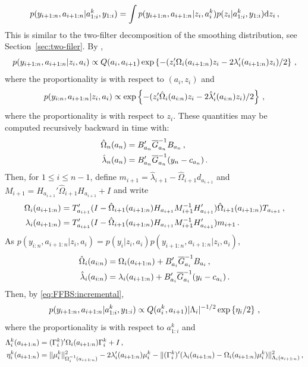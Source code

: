 \begin{equation}
\label{eq:FFBS:incremental}
p(y_{i+1:n},a_{i+1:n}|a^k_{1:i},y_{1:i}) = \int p(y_{i+1:n},a_{i+1:n}|z_i,a^k_{i})p(z_{i}|a^k_{1:i},y_{1:i})\mathrm{d} z_i\,,
\end{equation}
This is similar to the two-filter decomposition of the smoothing distribution, see Section~\ref{sec:two-filer}. By  \cite{lindsten:bunch:sarkka:schon:godsill:2015},
\[
p(y_{i+1:n},a_{i+1:n}|z_i,a_{i}) \propto Q(a_i,a_{i+1}) \exp\left\{-(z_i'\Omega_i(a_{i+1:n})z_i-2\lambda_i'(a_{i+1:n})z_i)/2\right\}\,,
\]
where the proportionality is with respect to $(a_i,z_i)$ and
\[
p(y_{i:n},a_{i+1:n}|z_i,a_{i}) \propto \exp\left\{-(z_i'\hat{\Omega}_i(a_{i:n})z_i-2\hat{\lambda}'_i(a_{i:n})z_i)/2\right\}\,,
\]
where the proportionality is with respect to $z_i$. These quantities may be computed recursively backward in time with:
\begin{align*}
\hat{\Omega}_n(a_n) &= B'_{a_n}\overline{G}^{-1}_{a_n}B_{a_n}\,,\\
\hat{\lambda}_n(a_n) &=B'_{a_n}\overline{G}^{-1}_{a_n}(y_n-c_{a_n})\,.
\end{align*}
Then, for $1\le i\le n-1$, define $m_{i+1} = \hat{\lambda}_{i+1} - \hat{\Omega}_{i+1}d_{a_{i+1}}$ and $M_{i+1} = H_{a_{i+1}}'\hat{\Omega}_{i+1}H_{a_{i+1}} + I$ and write
\begin{align*}
\Omega_i(a_{i+1:n}) &= T'_{a_{i+1}}(I-\hat{\Omega}_{i+1}(a_{i+1:n})H_{a_{i+1}}M^{-1}_{i+1}H'_{a_{i+1}})\hat{\Omega}_{i+1}(a_{i+1:n})T_{a_{i+1}}\,,\\
\lambda_i(a_{i+1:n}) &=T'_{a_{i+1}}(I-\hat{\Omega}_{i+1}(a_{i+1:n})H_{a_{i+1}}M^{-1}_{i+1}H'_{a_{i+1}})m_{i+1}\,.
\end{align*}
As $p(y_{i:n},a_{i+1:n}|z_i,a_{i}) = p(y_{i}|z_i,a_{i})p(y_{i+1:n},a_{i+1:n}|z_i,a_{i})$,
\begin{align*}
\hat{\Omega}_i(a_{i:n}) &= \Omega_i(a_{i+1:n})+ B'_{a_i}\overline{G}^{-1}_{a_i}B_{a_i}\,,\\
\hat{\lambda}_i(a_{i:n}) & = \lambda_i(a_{i+1:n}) + B'_{a_i}\overline{G}^{-1}_{a_i}(y_i-c_{a_i})\,.
\end{align*}
Then, by \eqref{eq:FFBS:incremental},
\begin{equation}
\label{eq:post:obs}
p(y_{i+1:n},a_{i+1:n}|a^k_{1:i},y_{1:i})\propto Q(a_i^k,a_{i+1})|\Lambda_i|^{-1/2}\exp\left\{\eta_i/2\right\}\,,
\end{equation}
where the proportionality is with respect to $a^k_{1:i}$ and
\begin{align*}
\Lambda^k_i(a_{i+1:n})&= (\Gamma_i^k)'\Omega_i(a_{i+1:n})\Gamma_i^k + I\,,\\
\eta^k_i(a_{i+1:n}) &= \|\mu_i^k\|^2_{\Omega^{-1}_i(a_{i+1:n})} - 2\lambda'_i(a_{i+1:n})\mu_i^k-\|(\Gamma_i^k)'(\lambda_i(a_{i+1:n})-\Omega_i(a_{i+1:n})\mu_i^k)\|^2_{\Lambda_i(a_{i+1:n})}\,,
\end{align*}
